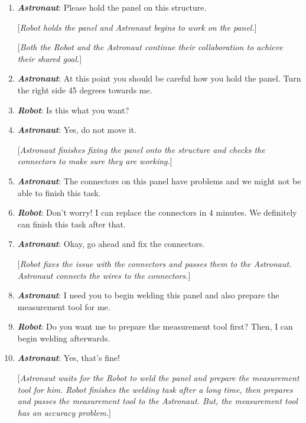 \documentclass[12pt]{report}
\begin{document}
\begin{enumerate}
  \item \textit{\textbf{Astronaut}}: Please hold the panel on this structure. 
  
  [\textit{Robot holds the panel and Astronaut begins to work on the panel.}]

  [\textit{Both the Robot and the Astronaut continue their collaboration to
  achieve their shared goal.}]

  \item \textit{\textbf{Astronaut}}: At this point you should be careful how you hold the
  panel. Turn the right side 45 degrees towards me.

  \item \textit{\textbf{Robot}}: Is this what you want?

  \item \textit{\textbf{Astronaut}}: Yes, do not move it.

  [\textit{Astronaut finishes fixing the panel onto the structure and checks the
  connectors to make sure they are working.}]

  \item \textit{\textbf{Astronaut}}: The connectors on this panel have problems and we
  might not be able to finish this task.

  \item \textit{\textbf{Robot}}: Don't worry! I can replace the connectors in 4 minutes.
  We definitely can finish this task after that.

  \item \textit{\textbf{Astronaut}}: Okay, go ahead and fix the connectors.

  [\textit{Robot fixes the issue with the connectors and passes them to the
  Astronaut. Astronaut connects the wires to the connectors.}]

  \item \textit{\textbf{Astronaut}}: I need you to begin welding this panel and also
  prepare the measurement tool for me.

  \item \textit{\textbf{Robot}}: Do you want me to prepare the measurement tool first?
  Then, I can begin welding afterwards.

  \item \textit{\textbf{Astronaut}}: Yes, that's fine!

  [\textit{Astronaut waits for the Robot to weld the panel and prepare the
  measurement tool for him. Robot finishes the welding task after a long time,
  then prepares and passes the measurement tool to the Astronaut. But, the
  measurement tool has an accuracy problem.}]


\end{enumerate}
\end{document}
